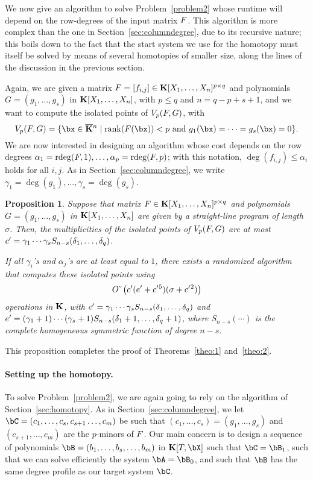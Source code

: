 \documentclass[12pt]{article}
\newtheorem{proposition}[definition]{Proposition}
\begin{document}
We now give an algorithm to solve Problem~\ref{problem2} whose runtime
will depend on the row-degrees of the input matrix ${F}$. This
algorithm is more complex than the one in 
Section~\ref{sec:columndegree}, due to its recursive nature; this
boils down to the fact that the start system we use for the homotopy
must itself be solved by means of several homotopies of smaller size,
along the lines of the discussion in the previous section.

Again, we are given a matrix ${F} =[f_{i,j}]\in \mathbf{K}[X_1,\dots,X_n]^{p
  \times q}$ and polynomials $G=(g_1,\dots,g_s)$ in
$\mathbf{K}[X_1,\dots,X_n]$, with $p \leq q$ and $n = q-p+s+1$, and we want to
compute the isolated points of $V_{p}({F},G)$, with
$$\VpFG{p}{\mF}{G} = \{\bx \in \KKbar{}^n \mid \mathrm{rank}(\mF({\bx})) < p
\text{~and~} g_1(\bx)=\cdots=g_s(\bx)=0\}.$$ We are now interested in
designing an algorithm whose cost depends on the row degrees
$\alpha_1=\mathrm{rdeg}({F},1),\dots,\alpha_p=\mathrm{rdeg}({F},p)$; with this
notation, $\deg(f_{i,j}) \leq \alpha_i$ holds for all $i,j$. As in 
Section~\ref{sec:columndegree}, we write
$\gamma_1=\deg(g_1),\dots,\gamma_s=\deg(g_s)$.


\begin{proposition}\label{prop:rowdegree}
  Suppose that matrix
  ${F} \in \mathbf{K}[X_1,\dots,X_n]^{p \times q}$ and polynomials
  $G=(g_1,\dots,g_s)$ in $\mathbf{K}[X_1,\dots,X_n]$ are given by a
  straight-line program of length $\sigma$. Then, 
 the multiplicities of
  the isolated points of $V_{p}({F},G)$ are at most   ${c'}{}=\gamma_1\cdots\gamma_s S_{n-s}(\delta_1, \ldots, \delta_q)$.

  If all $\gamma_i$'s and $\alpha_j$'s are at least equal to $1$, there exists  
  a randomized algorithm that computes these isolated points 
 using $${O}{\,\tilde{ }\,}\left({c'}{}({e'}{}+{c'}{}^5 )(\sigma + {c'}{}^2)  \right)$$
  operations in $\mathbf{K}$, with
  ${c'}{}=\gamma_1\cdots\gamma_s S_{n-s}(\delta_1, \ldots, \delta_q)$ and
  ${e'}{}=(\gamma_1+1)\cdots(\gamma_s+1) S_{n-s}(\delta_1+1, \ldots,
  \delta_q+1)$,
  where $S_{n-s}(\cdots)$ is the complete homogeneous symmetric 
  function of degree $n-s$.
\end{proposition}
This proposition completes the proof of Theorems~\ref{theo:1} and~\ref{theo:2}.

\paragraph{Setting up the homotopy.}
To solve Problem~\ref{problem2}, we are again going to rely on the
algorithm of Section~\ref{sec:homotopy}. As in Section~\ref{sec:columndegree},
we let $\bC=(c_1,\dots,c_s,c_{s+1}\dots,c_m)$ be such that
$(c_1,\dots,c_s)=(g_1,\dots,g_s)$ and $(c_{s+1},\dots,c_m)$ are the
$p$-minors of ${F}$. Our main concern is to design a sequence of
polynomials $\bB=(b_1,\dots,b_s,\dots,b_m)$ in $\KK[T,\bX]$ such that
$\bC=\bB_1$, such that we can solve efficiently the system
$\bA=\bB_0$, and such that $\bB$ has the same degree profile as our target system
$\bC$.
\end{document}
